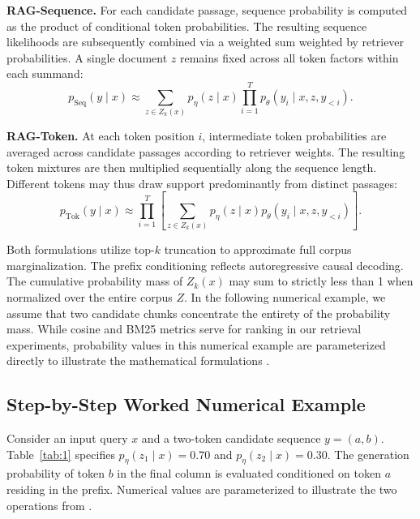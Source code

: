 \documentclass[12pt,a4paper]{article}
\begin{document}
\textbf{RAG-Sequence.} For each candidate passage, sequence probability is computed as the product of conditional token probabilities. The resulting sequence likelihoods are subsequently combined via a weighted sum weighted by retriever probabilities. A single document $z$ remains fixed across all token factors within each summand:
\begin{equation}
\label{eq:rag-sequence}
p_{\mathrm{Seq}}(y\mid x) \approx
\sum_{z\in Z_k(x)} p_\eta(z\mid x)
\prod_{i=1}^{T}p_\theta(y_i\mid x,z,y_{<i}).
\end{equation}

\textbf{RAG-Token.} At each token position $i$, intermediate token probabilities are averaged across candidate passages according to retriever weights. The resulting token mixtures are then multiplied sequentially along the sequence length. Different tokens may thus draw support predominantly from distinct passages:
\begin{equation}
\label{eq:rag-token}
p_{\mathrm{Tok}}(y\mid x) \approx
\prod_{i=1}^{T}\left[
\sum_{z\in Z_k(x)}p_\eta(z\mid x)
p_\theta(y_i\mid x,z,y_{<i})\right].
\end{equation}

Both formulations utilize top-$k$ truncation to approximate full corpus marginalization. The prefix conditioning reflects autoregressive causal decoding. The cumulative probability mass of $Z_k(x)$ may sum to strictly less than 1 when normalized over the entire corpus $Z$. In the following numerical example, we assume that two candidate chunks concentrate the entirety of the probability mass. While cosine and BM25 metrics serve for ranking in our retrieval experiments, probability values in this numerical example are parameterized directly to illustrate the mathematical formulations \cite{ref1}.

\subsection{Step-by-Step Worked Numerical Example}

Consider an input query $x$ and a two-token candidate sequence $y = (a, b)$. Table~\ref{tab:1} specifies $p_\eta(z_1 \mid x) = 0.70$ and $p_\eta(z_2 \mid x) = 0.30$. The generation probability of token $b$ in the final column is evaluated conditioned on token $a$ residing in the prefix. Numerical values are parameterized to illustrate the two operations from \cite{ref1}.
\end{document}
